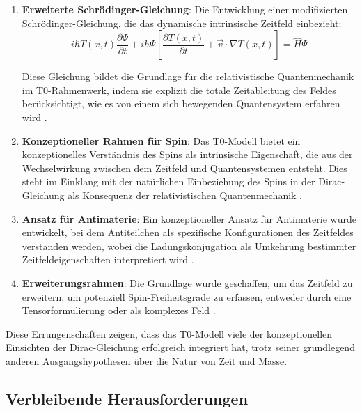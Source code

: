 \documentclass[12pt,a4paper]{article}
\newcommand{\Tfieldt}{T(x,t)}
\begin{document}
	\begin{enumerate}
		\item \textbf{Erweiterte Schrödinger-Gleichung}: Die Entwicklung einer modifizierten Schrödinger-Gleichung, die das dynamische intrinsische Zeitfeld einbezieht:
		\begin{equation}
			i\hbar \Tfieldt \frac{\partial\Psi}{\partial t} + i\hbar \Psi \left[\frac{\partial \Tfieldt}{\partial t} + \vec{v}\cdot\nabla\Tfieldt\right] = \hat{H} \Psi
			\label{eq:modified_schrodinger}
		\end{equation}
		
		Diese Gleichung bildet die Grundlage für die relativistische Quantenmechanik im T0-Rahmenwerk, indem sie explizit die totale Zeitableitung des Feldes berücksichtigt, wie es von einem sich bewegenden Quantensystem erfahren wird \cite{pascher_dynamic_timeField_2025}.
		
		\item \textbf{Konzeptioneller Rahmen für Spin}: Das T0-Modell bietet ein konzeptionelles Verständnis des Spins als intrinsische Eigenschaft, die aus der Wechselwirkung zwischen dem Zeitfeld und Quantensystemen entsteht. Dies steht im Einklang mit der natürlichen Einbeziehung des Spins in der Dirac-Gleichung als Konsequenz der relativistischen Quantenmechanik \cite{pascher_quantum_2025}.
		
		\item \textbf{Ansatz für Antimaterie}: Ein konzeptioneller Ansatz für Antimaterie wurde entwickelt, bei dem Antiteilchen als spezifische Konfigurationen des Zeitfeldes verstanden werden, wobei die Ladungskonjugation als Umkehrung bestimmter Zeitfeldeigenschaften interpretiert wird \cite{pascher_quantum_2025}.
		
		\item \textbf{Erweiterungsrahmen}: Die Grundlage wurde geschaffen, um das Zeitfeld zu erweitern, um potenziell Spin-Freiheitsgrade zu erfassen, entweder durch eine Tensorformulierung oder als komplexes Feld \cite{pascher_dynamic_timeField_2025}.
	\end{enumerate}
	
	Diese Errungenschaften zeigen, dass das T0-Modell viele der konzeptionellen Einsichten der Dirac-Gleichung erfolgreich integriert hat, trotz seiner grundlegend anderen Ausgangshypothesen über die Natur von Zeit und Masse.
	
	\subsection{Verbleibende Herausforderungen}
	\label{subsec:challenges}
	
\end{document}
